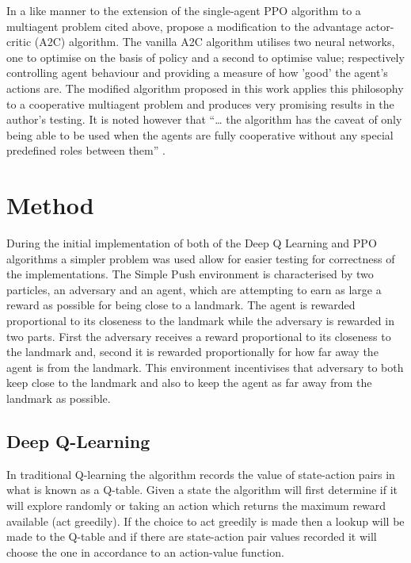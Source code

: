 \documentclass{article}
\begin{document}
In a like manner to the extension of the single-agent PPO algorithm to a multiagent problem cited above, \citet{9263738} propose a modification to the advantage actor-critic (A2C) algorithm.
The vanilla A2C algorithm utilises two neural networks, one to optimise on the basis of policy and a second to optimise value; respectively controlling agent behaviour and providing a measure of how 'good' the agent's actions are.
The modified algorithm proposed in this work applies this philosophy to a cooperative multiagent problem and produces very promising results in the author's testing.
It is noted however that “… the algorithm has the caveat of only being able to be used when the agents are fully cooperative without any special predefined roles between them” \citet{terry2020pettingzoo}.

\section{Method} \label{Method}

During the initial implementation of both of the Deep Q Learning and PPO algorithms a simpler problem was used allow for easier testing for correctness of the implementations.
The Simple Push environment is characterised by two particles, an adversary and an agent, which are attempting to earn as large a reward as possible for being close to a landmark.
The agent is rewarded proportional to its closeness to the landmark while the adversary is rewarded in two parts.
First the adversary receives a reward proportional to its closeness to the landmark and, second it is rewarded proportionally for how far away the agent is from the landmark.
This environment incentivises that adversary to both keep close to the landmark and also to keep the agent as far away from the landmark as possible.

\subsection{Deep Q-Learning} \label{DQN-Method}

In traditional Q-learning the algorithm records the value of state-action pairs in what is known as a Q-table.
Given a state the algorithm will first determine if it will explore randomly or taking an action which returns the maximum reward available (act greedily).
If the choice to act greedily is made then a lookup will be made to the Q-table and if there are state-action pair values recorded it will choose the one in accordance to an action-value function.
\end{document}
